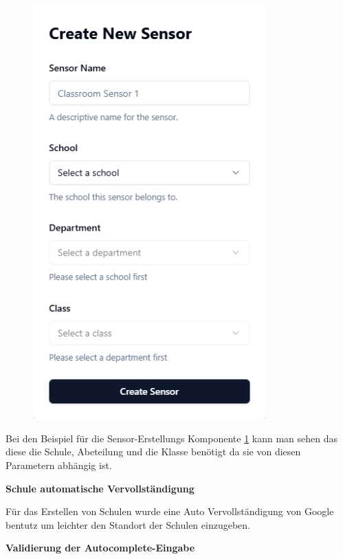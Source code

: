 \begin{inhalt}
\begin{enumerate}[label=\textbf{\arabic*.}]
\begin{figure}[!htb]
\centering
\includegraphics[width=0.8\textwidth]{files/Thomas/pics/Website/admin/sensors/sensor-create.png}
\caption[Bildbezeichnung für Abbildungsverzeichnis]{}
\label{fig:sensor-create}
\end{figure}

Bei den Beispiel für die Sensor-Erstellungs Komponente \ref{fig:sensor-create} kann man sehen das diese die Schule, Abeteilung und die Klasse benötigt da sie von diesen Parametern abhängig ist.

\newpage

\textbf{Schule automatische Vervollständigung}

Für das Erstellen von Schulen wurde eine Auto Vervollständigung von Google bentutz um leichter den Standort der Schulen einzugeben.

\textbf{Validierung der Autocomplete-Eingabe}


\end{enumerate}
\end{inhalt}
